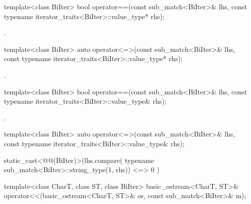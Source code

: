 %
\begin{itemdecl}
template<class BiIter>
  bool operator==(const sub_match<BiIter>& lhs,
                  const typename iterator_traits<BiIter>::value_type* rhs);
\end{itemdecl}

\begin{itemdescr}
\pnum
\returns
{}.
\end{itemdescr}

%
\begin{itemdecl}
template<class BiIter>
  auto operator<=>(const sub_match<BiIter>& lhs,
                   const typename iterator_traits<BiIter>::value_type* rhs);
\end{itemdecl}

\begin{itemdescr}
\pnum
\returns
{}.
\end{itemdescr}

%
\begin{itemdecl}
template<class BiIter>
  bool operator==(const sub_match<BiIter>& lhs,
                  const typename iterator_traits<BiIter>::value_type& rhs);
\end{itemdecl}

\begin{itemdescr}
\pnum
\returns
{}.
\end{itemdescr}

%
\begin{itemdecl}
template<class BiIter>
  auto operator<=>(const sub_match<BiIter>& lhs,
                   const typename iterator_traits<BiIter>::value_type& rhs);
\end{itemdecl}

\begin{itemdescr}
\pnum
\returns
\begin{codeblock}
static_cast<@@(BiIter)>(lhs.compare(
    typename sub_match<BiIter>::string_type(1, rhs))
      <=> 0
    )
\end{codeblock}
\end{itemdescr}

%
%
\begin{itemdecl}
template<class CharT, class ST, class BiIter>
  basic_ostream<CharT, ST>&
    operator<<(basic_ostream<CharT, ST>& os, const sub_match<BiIter>& m);
\end{itemdecl}

